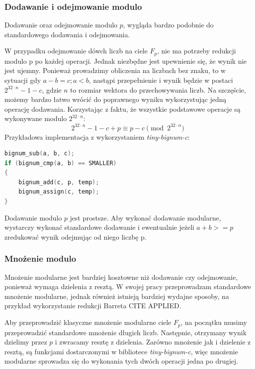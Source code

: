 \subsubsection{Dodawanie i odejmowanie modulo}
Dodawanie oraz odejmowanie modulo $p$, wygląda bardzo podobnie do standardowego dodawania i odejmowania.
\par
W przypadku odejmowanie dówch liczb na ciele $F_{p}$, nie ma potrzeby redukcji modulo p po każdej operacji.
Jednak niezbędne jest upewnienie się, że wynik nie jest ujemny. Ponieważ prowadzimy obliczenia na liczbach bez znaku,
to w sytuacji gdy $a - b = c; a < b$, nastąpi przepełnienie i wynik będzie w postaci $2^{32 \cdot n}-1 - c$, gdzie $n$ to rozmiar
wektora do przechowywania liczb. Na szczęście, możemy bardzo łatwo wrócić do poprawnego wyniku wykorzystując jedną operację
dodawania. Korzystając z faktu, że wszystkie podstawowe operacje są wykonywane modulo $2^{32 \cdot n}$:
$$
    2^{32 \cdot n} - 1 - c + p \equiv p - c \pmod{2^{32 \cdot n}}
$$
Przykładowa implementacja z wykorzystaniem \textit{tiny-bignum-c}:

\begin{lstlisting}[language=C++]
bignum_sub(a, b, c);
if (bignum_cmp(a, b) == SMALLER)
{
    bignum_add(c, p, temp);
    bignum_assign(c, temp);
}
\end{lstlisting}
\par
Dodawanie modulo $p$ jest prostsze.
Aby wykonać dodawanie modularne, wystarczy wykonać standardowe dodawanie i ewentualnie jeżeli $a + b >= p$ zredukować wynik odejmując
od niego liczbę p.

\subsubsection{Mnożenie modulo}
Mnożenie modularne jest bardziej kosztowne niż dodawanie czy odejmowanie, ponieważ wymaga dzielenia z resztą.
W swojej pracy przeprowadzam standardowe mnożenie modularne, jednak również istnieją bardziej wydajne sposoby, na przykład wykorzystanie redukcji Barreta CITE APPLIED.
\par
Aby przeprowadzić klasyczne mnożenie modularne ciele $F_{p}$, na początku musimy przeprowadzić standardowe mnożenie długich liczb.
Następnie, otrzymany wynik dzielimy przez $p$ i zwracamy resztę z dzielenia.
Zarówno mnożenie jak i dzielenie z resztą, są funkcjami dostarczonymi
w bibliotece \textit{tiny-bignum-c}, więc mnożenie modularne sprowadza się do wykonania tych dwóch operacji jedna po drugiej.

